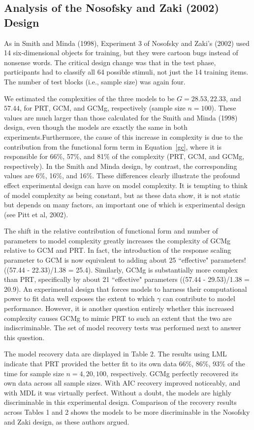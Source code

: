 \documentclass[11pt]{article}
\begin{document}
\subsection*{Analysis of the Nosofsky and Zaki (2002) Design}


As in Smith and Minda (1998), Experiment 3 of Nosofsky and Zaki's (2002) used 14
six-dimensional objects for training, but they were cartoon bugs instead of nonsense words.
The critical design change was that in the test phase, participants had to classify all 64
possible stimuli, not just the 14 training items. The number of test blocks (i.e., sample size)
was again four.


We estimated the complexities of the three models to be $G = 28.53, 22.33$, and $57.44$, for PRT,
GCM, and GCMg, respectively (sample size $n = 100$). These values are much larger than those
calculated for the Smith and Minda (1998) design, even though the models are exactly the same in
both experiments.\footnotemark[8] Furthermore, the cause of this increase in complexity is due to
the contribution from the functional form term in Equation~\ref{gc}, where it is responsible for
66\%, 57\%, and 81\% of the complexity (PRT, GCM, and GCMg, respectively). In the Smith and Minda
design, by contrast, the corresponding values are 6\%, 16\%, and 16\%. These differences clearly
illustrate the profound effect experimental design can have on model complexity. It is tempting to
think of model complexity as being constant, but as these data show, it is not static but depends
on many factors, an important one of which is experimental design (see Pitt et al, 2002).


The shift in the relative contribution of functional form and number of parameters to model
complexity greatly increases the complexity of GCMg relative to GCM and PRT. In fact, the
introduction of the response scaling parameter to GCM is now equivalent to adding about 25
``effective" parameters! ((57.44 - 22.33)/1.38 = 25.4). Similarly, GCMg is substantially more
complex than PRT, specifically by about 21 ``effective" parameters ((57.44 - 29.53)/1.38 = 20.9).
An experimental design that forces models to harness their computational power to fit data well
exposes the extent to which $\gamma$ can contribute to model performance. However, it is another
question entirely whether this increased complexity causes GCMg to mimic PRT to such an extent
that the two are indiscriminable. The set of model recovery tests was performed next to answer
this question.


The model recovery data are displayed in Table 2. The results using LML indicate that PRT provided
the better fit to its own data 66\%, 86\%, 93\% of the time for sample size $n = 4, 20, 100$,
respectively. GCMg perfectly recovered its own data across all sample sizes. With AIC recovery
improved noticeably, and with MDL it was virtually perfect. Without a doubt, the models are highly
discriminable in this experimental design. Comparison of the recovery results across Tables 1 and
2 shows the models to be more discriminable in the Nosofsky and Zaki design, as these authors
argued.
\end{document}
